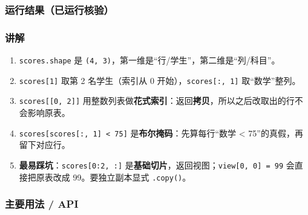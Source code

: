 \subsubsection{运行结果（已运行核验）}\label{ux8fd0ux884cux7ed3ux679cux5df2ux8fd0ux884cux6838ux9a8c}

\begin{Shaded}
\begin{Highlighting}[]
\NormalTok{第 1、3 名学生: [[85 92 78]}
\NormalTok{ [95 88 90]]}
\end{Highlighting}
\end{Shaded}

\subsubsection{讲解}\label{ux8bb2ux89e3}

\begin{enumerate}
\def\labelenumi{\arabic{enumi}.}
\tightlist
\item
  \texttt{scores.shape} 是
  \texttt{(4,\ 3)}，第一维是``行/学生''，第二维是``列/科目''。
\item
  \texttt{scores{[}1{]}} 取第 2 名学生（索引从 0
  开始），\texttt{scores{[}:,\ 1{]}} 取``数学''整列。
\item
  \texttt{scores{[}{[}0,\ 2{]}{]}}
  用整数列表做\textbf{花式索引}：返回\textbf{拷贝}，所以之后改取出的行不会影响原表。
\item
  \texttt{scores{[}scores{[}:,\ 1{]}\ \textless{}\ 75{]}}
  是\textbf{布尔掩码}：先算每行``数学 \textless{}
  75''的真假，再留下对应行。
\item
  \textbf{最易踩坑}：\texttt{scores{[}0:2,\ :{]}}
  是\textbf{基础切片}，返回视图；\texttt{view{[}0,\ 0{]}\ =\ 99}
  会直接把原表改成 99。要独立副本显式 \texttt{.copy()}。
\end{enumerate}

\subsubsection{主要用法 / API}\label{ux4e3bux8981ux7528ux6cd5-api}


